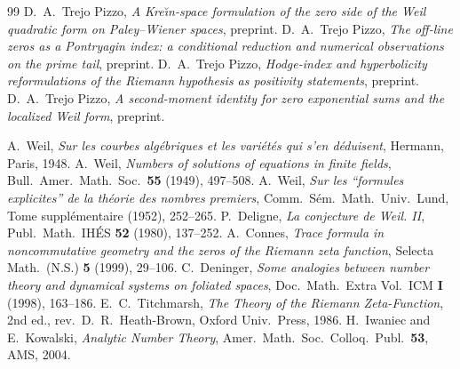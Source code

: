 \documentclass[11pt]{amsart}
\theoremstyle{definition}
\theoremstyle{remark}
\begin{document}
\begin{thebibliography}{99}
 D.~A.~Trejo Pizzo, \emph{A Kre\u\i n-space formulation of the zero side of the Weil quadratic form on Paley--Wiener spaces}, preprint.
 D.~A.~Trejo Pizzo, \emph{The off-line zeros as a Pontryagin index: a conditional reduction and numerical observations on the prime tail}, preprint.
 D.~A.~Trejo Pizzo, \emph{Hodge-index and hyperbolicity reformulations of the Riemann hypothesis as positivity statements}, preprint.
 D.~A.~Trejo Pizzo, \emph{A second-moment identity for zero exponential sums and the localized Weil form}, preprint.

 A.~Weil, \emph{Sur les courbes alg\'ebriques et les vari\'et\'es qui s'en d\'eduisent}, Hermann, Paris, 1948.
 A.~Weil, \emph{Numbers of solutions of equations in finite fields}, Bull.\ Amer.\ Math.\ Soc.\ \textbf{55} (1949), 497--508.
 A.~Weil, \emph{Sur les ``formules explicites'' de la th\'eorie des nombres premiers}, Comm.\ S\'em.\ Math.\ Univ.\ Lund, Tome suppl\'ementaire (1952), 252--265.
 P.~Deligne, \emph{La conjecture de Weil. II}, Publ.\ Math.\ IH\'ES \textbf{52} (1980), 137--252.
 A.~Connes, \emph{Trace formula in noncommutative geometry and the zeros of the Riemann zeta function}, Selecta Math.\ (N.S.) \textbf{5} (1999), 29--106.
 C.~Deninger, \emph{Some analogies between number theory and dynamical systems on foliated spaces}, Doc.\ Math.\ Extra Vol.\ ICM \textbf{I} (1998), 163--186.
 E.~C.~Titchmarsh, \emph{The Theory of the Riemann Zeta-Function}, 2nd ed., rev.\ D.~R.~Heath-Brown, Oxford Univ.\ Press, 1986.
 H.~Iwaniec and E.~Kowalski, \emph{Analytic Number Theory}, Amer.\ Math.\ Soc.\ Colloq.\ Publ.\ \textbf{53}, AMS, 2004.
\end{thebibliography}
\end{document}
